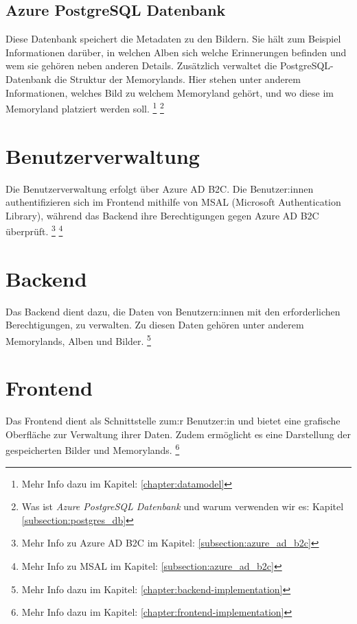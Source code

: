 \subsection{Azure PostgreSQL Datenbank}

Diese Datenbank speichert die Metadaten zu den Bildern. 
Sie hält zum Beispiel Informationen darüber, in welchen Alben sich welche Erinnerungen befinden
und wem sie gehören neben anderen Details. Zusätzlich verwaltet die PostgreSQL-Datenbank die 
Struktur der Memorylands. Hier stehen unter anderem Informationen, welches Bild zu welchem 
Memoryland gehört, und wo diese im Memoryland platziert werden soll.
\footnote{Mehr Info dazu im Kapitel: \ref{chapter:datamodel}}
\footnote{Was ist \emph{Azure PostgreSQL Datenbank} und warum verwenden wir es: Kapitel \ref{subsection:postgres_db}}

\section{Benutzerverwaltung}

Die Benutzerverwaltung erfolgt über Azure AD B2C. Die Benutzer:innen authentifizieren sich 
im Frontend mithilfe von MSAL (Microsoft Authentication Library), während das Backend 
ihre Berechtigungen gegen Azure AD B2C überprüft.
\footnote{Mehr Info zu Azure AD B2C im Kapitel: \ref{subsection:azure_ad_b2c}}
\footnote{Mehr Info zu MSAL im Kapitel: \ref{subsection:azure_ad_b2c}}

\section{Backend}

Das Backend dient dazu, die Daten von Benutzern:innen mit den erforderlichen
Berechtigungen, zu verwalten. Zu diesen Daten gehören unter anderem Memorylands, 
Alben und Bilder. \footnote{Mehr Info dazu im Kapitel: \ref{chapter:backend-implementation}}

\section{Frontend}

Das Frontend dient als Schnittstelle zum:r Benutzer:in und bietet eine grafische 
Oberfläche zur Verwaltung ihrer Daten. Zudem ermöglicht es eine Darstellung 
der gespeicherten Bilder und Memorylands.
\footnote{Mehr Info dazu im Kapitel: \ref{chapter:frontend-implementation}}

